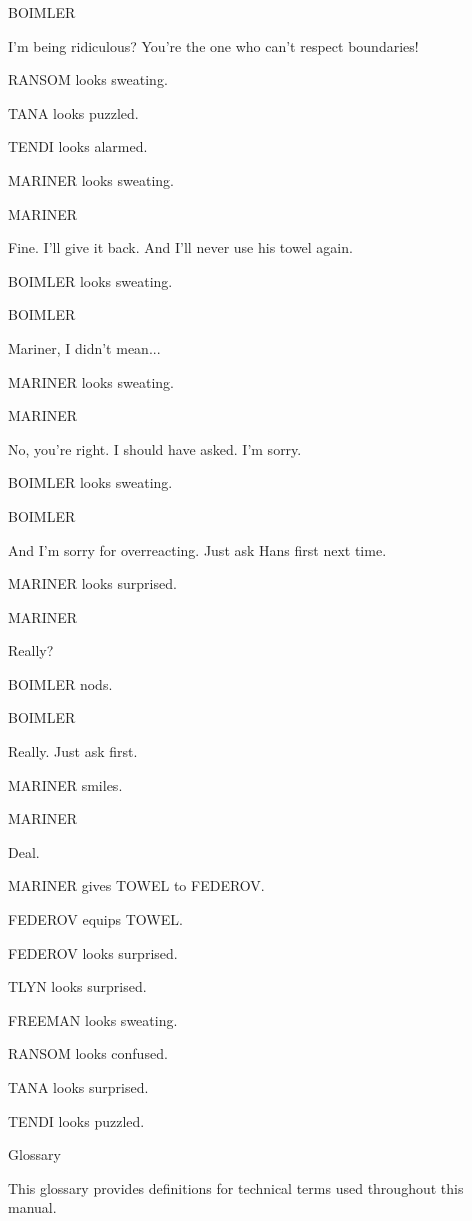 \documentclass[11pt,letterpaper,oldstylefigures]{memoir}
\makeatletter
\newcommand{\speaker}[1]{\nobreak\hspace*{0.333\textwidth}\MakeUppercase{#1}\par\nobreak\vspace{0.5\baselineskip}}
\newcommand{\dialogue}[1]{\nobreak\hspace*{0.25\textwidth}\begin{minipage}{0.5\textwidth}#1\end{minipage}\par\vspace{1\baselineskip}}
\newcommand{\stagedir}[1]{#1\par\vspace{1\baselineskip}}
\newenvironment{FountainExample}
  {\begingroup
  \ttfamily\small
   \setlength{\parindent}{0pt}
  \setlength{\parskip}{0.5em}
  \allowdisplaybreaks
  \setlength{\displaywidowpenalty}{0}
  \setlength{\widowpenalty}{0}
  \setlength{\clubpenalty}{0}
  \setlength{\interlinepenalty}{0}
}
  {\endgroup}
\let\oldchapter\chapter
\def\chapter{%
  \@ifstar
    {\FountainScripting@starchapter}%
    {\@dblarg\FountainScripting@chapter}}
\def\FountainScripting@starchapter#1{\oldchapter*{#1}\chaptermark{#1}}
\def\FountainScripting@chapter[#1]#2{\oldchapter[#1]{#2}\chaptermark{#2}}
\makeatother
\begin{document}
\begin{FountainExample}
\speaker{BOIMLER}
\dialogue{I'm being ridiculous? You're the one who can't respect boundaries!}

\stagedir{RANSOM looks sweating.}

\stagedir{TANA looks puzzled.}

\stagedir{TENDI looks alarmed.}

\stagedir{MARINER looks sweating.}

\speaker{MARINER}
\dialogue{Fine. I'll give it back. And I'll never use his towel again.}

\stagedir{BOIMLER looks sweating.}

\speaker{BOIMLER}
\dialogue{Mariner, I didn't mean...}

\stagedir{MARINER looks sweating.}

\speaker{MARINER}
\dialogue{No, you're right. I should have asked. I'm sorry.}

\stagedir{BOIMLER looks sweating.}

\speaker{BOIMLER}
\dialogue{And I'm sorry for overreacting. Just ask Hans first next time.}

\stagedir{MARINER looks surprised.}

\speaker{MARINER}
\dialogue{Really?}

\stagedir{BOIMLER nods.}

\speaker{BOIMLER}
\dialogue{Really. Just ask first.}

\stagedir{MARINER smiles.}

\speaker{MARINER}
\dialogue{Deal.}

\stagedir{MARINER gives TOWEL to FEDEROV.}
\stagedir{FEDEROV equips TOWEL.}
\stagedir{FEDEROV looks surprised.}

\stagedir{TLYN looks surprised.}

\stagedir{FREEMAN looks sweating.}

\stagedir{RANSOM looks confused.}

\stagedir{TANA looks surprised.}

\stagedir{TENDI looks puzzled.}
\end{FountainExample}

\chapter{Glossary}
\label{app:glossary}

This glossary provides definitions for technical terms used throughout this manual.

\printglossary[style=long]
\end{document}
